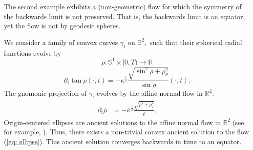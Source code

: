 \documentclass{amsart}
\begin{document}
The second example exhibits a (non-geometric) flow for which the symmetry of the backwards limit is not preserved. That is, the backwards limit is an equator, yet the flow is not by geodesic spheres. 
\begin{example}
We consider a family of convex curves $\gamma_t$ on $\mathbb{S}^2,$ such that their spherical radial functions evolve by
\[\rho:\mathbb{S}^1\times[0,T)\to \mathbb{R}\]
\begin{equation}\label{eq: ellipse}
\partial_t\tan\rho(\cdot,t)=-\kappa^{\frac{1}{3}} \frac{\sqrt{\sin^2\rho+\rho_{\theta}^2}}{\sin\rho}(\cdot,t).
\end{equation}
The gnomonic projection of $\gamma_t$ evolves by the affine normal flow in $\mathbb{R}^2:$ 
\begin{align*}
\partial_t\bar{\rho}&=-\bar{\kappa}^{\frac{1}{3}}\frac{\sqrt{\bar{\rho}^2+\bar{\rho}_{\theta}^2}}{\bar{\rho}}.
\end{align*}
Origin-centered ellipses are ancient solutions to the affine normal flow in $\mathbb{R}^2$ (see, for example, \cite{Ivaki:2016}). Thus, there exists a non-trivial convex ancient solution to the flow (\ref{eq: ellipse}). This ancient solution converges backwards in time to an equator.
\end{example}
\end{document}
